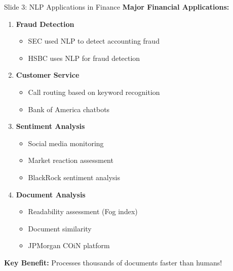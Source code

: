 \documentclass[8pt]{beamer}
\begin{document}
	\begin{frame}{Slide 3: NLP Applications in Finance}
		\fontsize{6.5}{7.5}\selectfont
		\textbf{Major Financial Applications:}
		\begin{enumerate}
			\item \textbf{Fraud Detection}
			\begin{itemize}
				\item SEC used NLP to detect accounting fraud
				\item HSBC uses NLP for fraud detection
			\end{itemize}
			\item \textbf{Customer Service}
			\begin{itemize}
				\item Call routing based on keyword recognition
				\item Bank of America chatbots
			\end{itemize}
			\item \textbf{Sentiment Analysis}
			\begin{itemize}
				\item Social media monitoring
				\item Market reaction assessment
				\item BlackRock sentiment analysis
			\end{itemize}
			\item \textbf{Document Analysis}
			\begin{itemize}
				\item Readability assessment (Fog index)
				\item Document similarity
				\item JPMorgan COiN platform
			\end{itemize}
		\end{enumerate}
		
		\textcolor{myblue}{\textbf{Key Benefit:}} Processes thousands of documents faster than humans!
	\end{frame}
	
\end{document}
